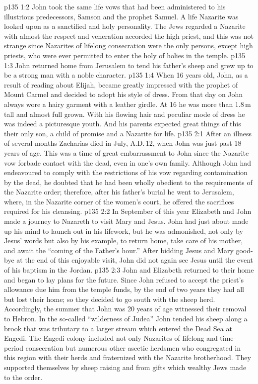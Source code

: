 \vs p135 1:2 John took the same life vows that had been administered to his illustrious predecessors, Samson and the prophet Samuel. A life Nazarite was looked upon as a sanctified and holy personality. The Jews regarded a Nazarite with almost the respect and veneration accorded the high priest, and this was not strange since Nazarites of lifelong consecration were the only persons, except high priests, who were ever permitted to enter the holy of holies in the temple.
\vs p135 1:3 \pc John returned home from Jerusalem to tend his father’s sheep and grew up to be a strong man with a noble character.
\vs p135 1:4 When 16 years old, John, as a result of reading about Elijah, became greatly impressed with the prophet of Mount Carmel and decided to adopt his style of dress. From that day on John always wore a hairy garment with a leather girdle. At 16 he was more than 1.8\,m tall and almost full grown. With his flowing hair and peculiar mode of dress he was indeed a picturesque youth. And his parents expected great things of this their only son, a child of promise and a Nazarite for life.
\vs p135 2:1 After an illness of several months Zacharias died in July, A.D.\,12, when John was just past 18 years of age. This was a time of great embarrassment to John since the Nazarite vow forbade contact with the dead, even in one’s own family. Although John had endeavoured to comply with the restrictions of his vow regarding contamination by the dead, he doubted that he had been wholly obedient to the requirements of the Nazarite order; therefore, after his father’s burial he went to Jerusalem, where, in the Nazarite corner of the women’s court, he offered the sacrifices required for his cleansing.
\vs p135 2:2 \pc In September of this year Elizabeth and John made a journey to Nazareth to visit Mary and Jesus. John had just about made up his mind to launch out in his lifework, but he was admonished, not only by Jesus’ words but also by his example, to return home, take care of his mother, and await the “coming of the Father’s hour.” After bidding Jesus and Mary good\hyp{}bye at the end of this enjoyable visit, John did not again see Jesus until the event of his baptism in the Jordan.
\vs p135 2:3 John and Elizabeth returned to their home and began to lay plans for the future. Since John refused to accept the priest’s allowance due him from the temple funds, by the end of two years they had all but lost their home; so they decided to go south with the sheep herd. Accordingly, the summer that John was 20 years of age witnessed their removal to Hebron. In the so\hyp{}called “wilderness of Judea” John tended his sheep along a brook that was tributary to a larger stream which entered the Dead Sea at Engedi. The Engedi colony included not only Nazarites of lifelong and time\hyp{}period consecration but numerous other ascetic herdsmen who congregated in this region with their herds and fraternized with the Nazarite brotherhood. They supported themselves by sheep raising and from gifts which wealthy Jews made to the order.
